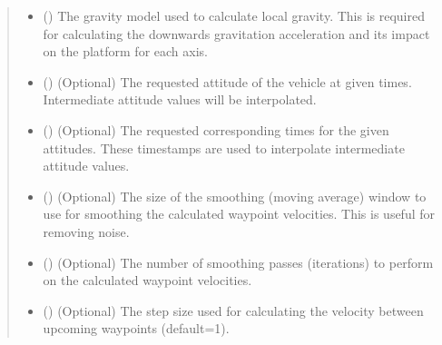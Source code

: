 \documentclass[letterpaper,10pt,english]{sphinxmanual}
\begin{document}
\begin{fulllineitems}
\begin{quote}
\begin{description}
\begin{itemize}
\item {} 
\sphinxAtStartPar
{} ({\hyperref[\detokenize{modules/gravity/base:qnav.gravity.base.GravityModel}]{}}) \textendash{} The gravity model used to calculate local gravity.
This is required for calculating the downwards gravitation
acceleration and its impact on the platform for each axis.

\item {} 
\sphinxAtStartPar
{} (\sphinxstyleliteralemphasis{\sphinxupquote{ (}}\sphinxstyleliteralemphasis{\sphinxupquote{)}}) \textendash{} (Optional) The requested attitude of the vehicle at
given times. Intermediate attitude values will be interpolated.

\item {} 
\sphinxAtStartPar
{} (\sphinxstyleliteralemphasis{\sphinxupquote{ (}}\sphinxstyleliteralemphasis{\sphinxupquote{)}}) \textendash{} (Optional) The requested corresponding times for
the given attitudes. These timestamps are used to interpolate
intermediate attitude values.

\item {} 
\sphinxAtStartPar
{} () \textendash{} (Optional) The size of the smoothing
(moving average) window to use for smoothing the calculated
waypoint velocities. This is useful for removing noise.

\item {} 
\sphinxAtStartPar
{} () \textendash{} (Optional) The number of smoothing passes
(iterations) to perform on the calculated waypoint velocities.

\item {} 
\sphinxAtStartPar
{} () \textendash{} (Optional) The step size used for calculating the
velocity between upcoming waypoints (default=1).


\end{itemize}
\end{description}
\end{quote}
\end{fulllineitems}
\end{document}
